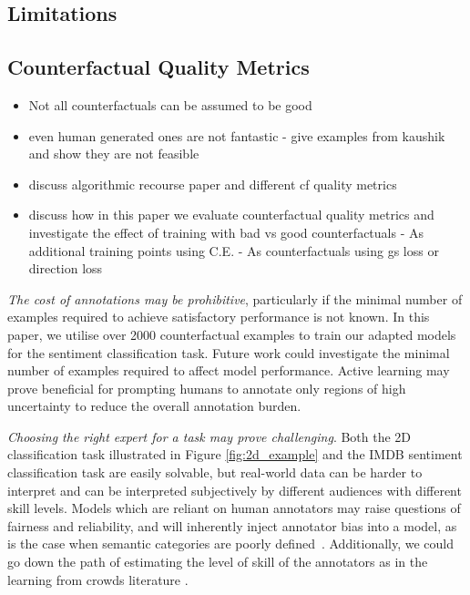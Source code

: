 \documentclass[sigconf,anonymous]{aamas}
\begin{document}
\subsection{Limitations}


\subsection{Counterfactual Quality Metrics}
\begin{itemize}
    \item Not all counterfactuals can be assumed to be good
    \item even human generated ones are not fantastic - give examples from kaushik and show they are not feasible
    \item discuss algorithmic recourse paper and different cf quality metrics
    \item discuss how in this paper we evaluate counterfactual quality metrics and investigate the effect of training with bad vs good counterfactuals
    \subitem - As additional training points using C.E.
    \subitem - As counterfactuals using gs loss or direction loss
    
\end{itemize}

\emph{The cost of annotations may be prohibitive}, particularly if the minimal number of examples required to achieve satisfactory performance is not known. In this paper, we utilise over 2000 counterfactual examples to train our adapted models for the sentiment classification task. Future work could investigate the minimal number of examples required to affect model performance. Active learning may prove beneficial for prompting humans to annotate only regions of high uncertainty to reduce the overall annotation burden. 

\emph{Choosing the right expert for a task may prove challenging}. Both the 2D classification task illustrated in Figure \ref{fig:2d_example} and the IMDB sentiment classification task are easily solvable, but real-world data can be harder to interpret and can be interpreted subjectively by different audiences with different skill levels. Models which are reliant on human annotators may raise questions of fairness and reliability, and will inherently inject annotator bias into a model, as is the case when semantic categories are poorly defined~\cite{malisiewicz2008recognition}. Additionally, we could go down the path of estimating the level of skill of the annotators as in the learning from crowds literature \cite{raykar10a}.
\end{document}
